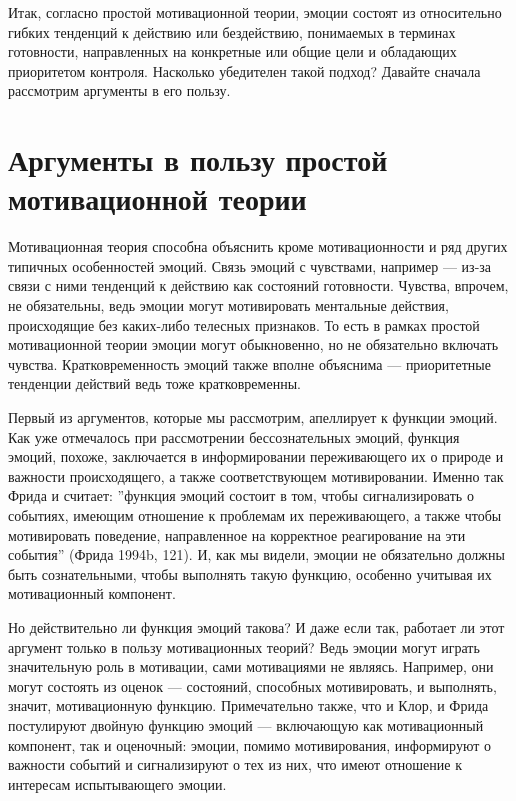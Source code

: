 \documentclass[11pt]{book}
\begin{document}
Итак, согласно простой мотивационной теории, эмоции состоят из относительно гибких тенденций к действию или бездействию, понимаемых в терминах готовности, направленных на конкретные или общие цели и обладающих приоритетом контроля. Насколько убедителен такой подход? Давайте сначала рассмотрим аргументы в его пользу.

\section{Аргументы в пользу простой мотивационной теории}

Мотивационная теория способна объяснить кроме мотивационности и ряд других типичных особенностей эмоций. Связь эмоций с чувствами, например --- из-за связи с ними тенденций к действию как состояний готовности. Чувства, впрочем, не обязательны, ведь эмоции могут мотивировать ментальные действия, происходящие без каких-либо телесных признаков. То есть в рамках простой мотивационной теории эмоции могут обыкновенно, но не обязательно включать чувства. Кратковременность эмоций также вполне объяснима --- приоритетные тенденции действий ведь тоже кратковременны.

Первый из аргументов, которые мы рассмотрим, апеллирует к функции эмоций. Как уже отмечалось при рассмотрении бессознательных эмоций, функция эмоций, похоже, заключается в информировании переживающего их о природе и важности происходящего, а также соответствующем мотивировании. Именно так Фрида и считает: ''функция эмоций состоит в том, чтобы сигнализировать о событиях, имеющим отношение к проблемам их переживающего, а также чтобы мотивировать поведение, направленное на корректное реагирование на эти события'' (Фрида 1994b, 121). И, как мы видели, эмоции не обязательно должны быть сознательными, чтобы выполнять такую функцию, особенно учитывая их мотивационный компонент.

Но действительно ли функция эмоций такова? И даже если так, работает ли этот аргумент только в пользу мотивационных теорий? Ведь эмоции могут играть значительную роль в мотивации, сами мотивациями не являясь. Например, они могут состоять из оценок --- состояний, способных мотивировать, и выполнять, значит, мотивационную функцию. Примечательно также, что и Клор, и Фрида постулируют двойную функцию эмоций --- включающую как мотивационный компонент, так и оценочный: эмоции, помимо мотивирования, информируют о важности событий и сигнализируют о тех из них, что имеют отношение к интересам испытывающего эмоции.
\end{document}

